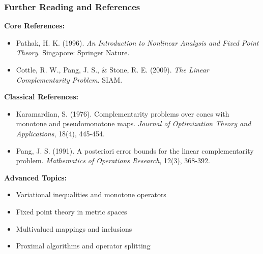 \documentclass[aspectratio=169,10pt]{beamer}
\begin{document}
\begin{frame}
\frametitle{Further Reading and References}

\textbf{Core References:}
\begin{itemize}
    \item Pathak, H. K. (1996). \textit{An Introduction to Nonlinear Analysis and Fixed Point Theory}. Singapore: Springer Nature.

    \item Cottle, R. W., Pang, J. S., \& Stone, R. E. (2009). \textit{The Linear Complementarity Problem}. SIAM.
\end{itemize}

\vspace{0.3cm}

\textbf{Classical References:}
\begin{itemize}
    \item Karamardian, S. (1976). Complementarity problems over cones with monotone and pseudomonotone maps. \textit{Journal of Optimization Theory and Applications}, 18(4), 445-454.

    \item Pang, J. S. (1991). A posteriori error bounds for the linear complementarity problem. \textit{Mathematics of Operations Research}, 12(3), 368-392.
\end{itemize}

\vspace{0.3cm}

\textbf{Advanced Topics:}
\begin{itemize}
    \item Variational inequalities and monotone operators
    \item Fixed point theory in metric spaces
    \item Multivalued mappings and inclusions
    \item Proximal algorithms and operator splitting
\end{itemize}

\end{frame}
\end{document}
